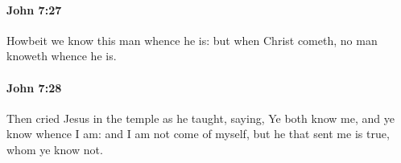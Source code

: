 		\paragraph{John 7:27} %
			\label{JOHN-7-27}

			Howbeit we know this man whence he is: but when Christ cometh, no man knoweth whence he is.

			\begin{framed}
			\scriptsize
				\begin{compactdesc}
					\item[SBLG] 
				\end{compactdesc}
			\end{framed}

		\paragraph{John 7:28} %
			\label{JOHN-7-28}

			Then cried Jesus in the temple as he taught, saying, Ye both know me, and ye know whence I am: and I am not come of myself, but he that sent me is true, whom ye know not.


